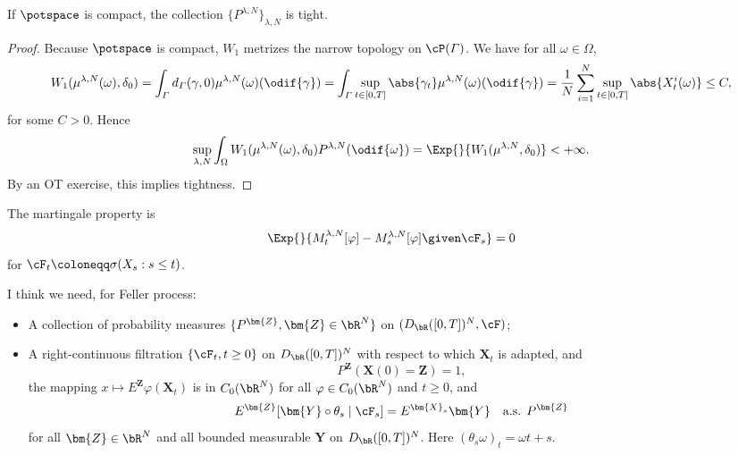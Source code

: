 \begin{lemma}
  If \(\potspace\) is compact, the collection \(\{P^{\lambda, N}\}_{\lambda,N}\) is tight.
\end{lemma}
\begin{proof}
  Because \(\potspace\) is compact, \(W_1\) metrizes the narrow topology on \(\cP(\varGamma)\).
  We have for all \(\omega \in \Omega\),
  \begin{equation}
    W_1(\mu^{\lambda, N}(\omega), \delta_0)
    = \int_{\varGamma} d_\varGamma(\gamma,0) \mu^{\lambda,N}(\omega) (\odif{\gamma})
    = \int_{\varGamma} \sup_{t \in [0,T]} \abs{\gamma_t} \mu^{\lambda,N}(\omega) (\odif{\gamma})
    = \frac{1}{N} \sum_{i=1}^N \sup_{t \in [0,T]} \abs{X^i_t(\omega)} \leq C,
  \end{equation}
  for some \(C > 0\).
  Hence
  \begin{equation}
    \sup_{\lambda, N} \int_\Omega W_1(\mu^{\lambda, N}(\omega), \delta_0) P^{\lambda, N}(\odif{\omega})
    = \Exp{}{W_1(\mu^{\lambda, N}, \delta_0)} < +\infty.
  \end{equation}
  By an OT exercise, this implies tightness.
\end{proof}



The martingale property is
\begin{equation}
  \Exp{}{M_t^{\lambda, N}[\varphi] - M_s^{\lambda, N}[\varphi] \given \cF_s} = 0
\end{equation}
for \(\cF_t \coloneqq \sigma(X_s : s \leq t)\).


I think we need, for Feller process:
\begin{itemize}
  \item A collection of probability measures \(\{P^\bm{Z}, \bm{Z} \in \bR^N\}\) on \((D_\bR([0,T])^N, \cF)\);

  \item A right-continuous filtration \(\{\cF_t, t \geq 0\}\) on \(D_\bR([0,T])^N\) with respect to which \(\bm{X}_t\) is adapted, and
        \begin{equation}
          P^\bm{Z}(\bm{X}(0) = \bm{Z}) = 1,
        \end{equation}
        the mapping \(x \mapsto E^\bm{Z} \varphi(\bm{X}_t)\) is in \(C_0(\bR^N)\) for all \(\varphi \in C_0(\bR^N)\) and \(t \geq 0\),
        and
        \begin{equation}
          E^\bm{Z}[ \bm{Y} \circ \theta_s \mid \cF_s] = E^{\bm{X}_s} \bm{Y} \quad \text{a.s. } P^\bm{Z}
        \end{equation}
        for all \(\bm{Z} \in \bR^N\) and all bounded measurable \(\bm{Y}\) on \(D_\bR([0,T])^N\). Here \((\theta_s\omega)_t = \omega{t+s}\).
\end{itemize}